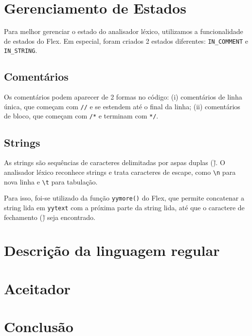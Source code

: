 \documentclass[12pt,a4paper]{article}
\begin{document}
\section{Gerenciamento de Estados}

Para melhor gerenciar o estado do analisador léxico, utilizamos a funcionalidade de estados do Flex. Em especial, foram criados 2 estados diferentes: \texttt{IN\_COMMENT} e \texttt{IN\_STRING}. 

\subsection{Comentários}
Os comentários podem aparecer de 2 formas no código: (i) comentários de linha única, que começam com \texttt{//} e se estendem até o final da linha; (ii) comentários de bloco, que começam com \texttt{/*} e terminam com \texttt{*/}.

\subsection{Strings}

As strings são sequências de caracteres delimitadas por aspas duplas (\texttt{\"}). O analisador léxico reconhece strings e trata caracteres de escape, como \texttt{\textbackslash n} para nova linha e \texttt{\textbackslash t} para tabulação.

Para isso, foi-se utilizado da função \texttt{yymore()} do Flex, que permite concatenar a string lida em \texttt{yytext} com a próxima parte da string lida, até que o caractere de fechamento (\texttt{\"}) seja encontrado.

\section{Descrição da linguagem regular}

\section{Aceitador}

\section{Conclusão}
\end{document}
